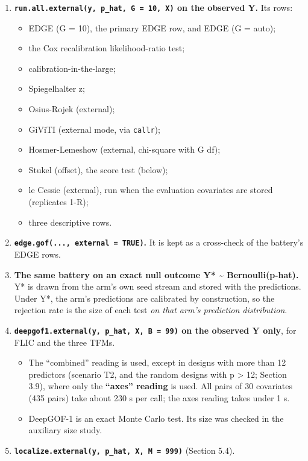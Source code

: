 \documentclass[
  10pt,
]{article}
\providecommand{\tightlist}{%
  \setlength{\itemsep}{0pt}\setlength{\parskip}{0pt}}
\begin{document}
\begin{enumerate}
\def\labelenumi{\arabic{enumi}.}
\tightlist
\item
  \textbf{\texttt{run.all.external(y,\ p\_hat,\ G\ =\ 10,\ X)}
  on the observed Y.} Its rows:

  \begin{itemize}
  \tightlist
  \item
    EDGE (G = 10), the primary EDGE row, and EDGE (G =
    auto);
  \item
    the Cox recalibration likelihood-ratio test;
  \item
    calibration-in-the-large;
  \item
    Spiegelhalter z;
  \item
    Osius-Rojek (external);
  \item
    GiViTI (external mode, via \texttt{callr});
  \item
    Hosmer-Lemeshow (external, chi-square with G df);
  \item
    Stukel (offset), the score test (below);
  \item
    le Cessie (external), run when the evaluation covariates
    are stored (replicates 1-R);
  \item
    three descriptive rows.
  \end{itemize}
\item
  \textbf{\texttt{edge.gof(...,\ external\ =\ TRUE)}.} It is
  kept as a cross-check of the battery's EDGE rows.
\item
  \textbf{The same battery on an exact null outcome Y*
  \textasciitilde{} Bernoulli(p-hat).} Y* is drawn from the
  arm's own seed stream and stored with the predictions.
  Under Y*, the arm's predictions are calibrated by
  construction, so the rejection rate is the size of each
  test \emph{on that arm's prediction distribution}.
\item
  \textbf{\texttt{deepgof1.external(y,\ p\_hat,\ X,\ B\ =\ 99)}
  on the observed Y only}, for FLIC and the three TFMs.

  \begin{itemize}
  \tightlist
  \item
    The ``combined'' reading is used, except in designs with
    more than 12 predictors (scenario T2, and the random
    designs with p \textgreater{} 12; Section 3.9), where
    only the \textbf{``axes'' reading} is used. All pairs of
    30 covariates (435 pairs) take about 230 s per call; the
    axes reading takes under 1 s.
  \item
    DeepGOF-1 is an exact Monte Carlo test. Its size was
    checked in the auxiliary size study.
  \end{itemize}
\item
  \textbf{\texttt{localize.external(y,\ p\_hat,\ X,\ M\ =\ 999)}}
  (Section 5.4).
\end{enumerate}
\end{document}
